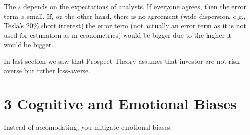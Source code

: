 \documentclass[0pt, a4paper]{article}
\begin{document}
The $\varepsilon$ depends on the expectations of analysts. If everyone agrees, then the error term is small. If, on the other hand, there is no agreement (wide dispersion, e.g., Tesla's 20\% short interest) the error term (not actually an error term as it is not used for estimation as in econometrics) would be bigger due to the higher it would be bigger.



In last section we saw that Prospect Theory assumes that investor are not risk-averse but rather loss-averse.

\section*{3 Cognitive and Emotional Biases}

Instead of accomodating, you mitigate emotional biases.
\end{document}
